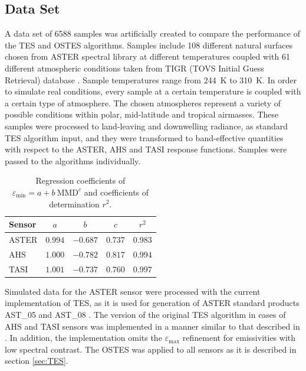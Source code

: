 \subsection*{Data Set}

A data set of 6588 samples was artificially created to compare the performance of the TES and OSTES algorithms. Samples include 108 different natural surfaces chosen from ASTER spectral library \cite{BH09} at different temperatures coupled with 61 different atmospheric conditions taken from TIGR (TOVS Initial Guess Retrieval) database \cite{CS85, CC98}. Sample temperatures range from \SI{244}{\kelvin} to \SI{310}{\kelvin}. In order to simulate real conditions, every sample at a certain temperature is coupled with a certain type of atmosphere. The chosen atmospheres represent a variety of possible conditions within polar, mid-latitude and tropical airmasses. These samples were processed to land-leaving and downwelling radiance, as standard TES algorithm input, and they were transformed to band-effective quantities with respect to the ASTER, AHS and TASI response functions. Samples were passed to the algorithms individually.

\begin{table}[!t]
\vspace{0.5em}
\footnotesize
\centering
\begin{tabular}{lcccc}
\toprule
Sensor & $a$ & $b$ & $c$ & $r^2$\\ \hline
ASTER & $0.994$ & $-0.687$ & $0.737$ & $0.983$ \\
AHS & $1.000$ & $-0.782$ & $0.817$ & $0.994$ \\
TASI & $1.001$ & $-0.737$ & $0.760$ & $0.997$ \\
\bottomrule
\end{tabular}
\vspace{1.5 em}
\caption{Regression coefficients of $\varepsilon_\mathrm{min} = a + b\:\mathrm{MMD}^c$ and coefficients of determination $r^2$.}
\label{table:MMDcoef}
\normalsize
\end{table}

\newpage
Simulated data for the ASTER sensor were processed with the current implementation of TES, as it is used for generation of ASTER standard products AST\_05 and AST\_08 \cite{B15}. The version of the original TES algorithm in cases of AHS and TASI sensors was implemented in a manner similar to that described in \cite{JS12}. In addition, the implementation omits the $\varepsilon_\mathrm{max}$ refinement for emissivities with low spectral contrast. The OSTES was applied to all sensors as it is described in section \ref{sec:TES}.


